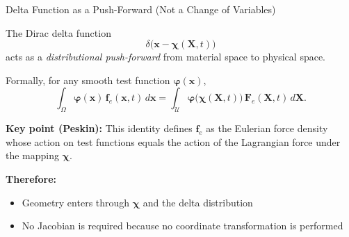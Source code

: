 \documentclass{beamer}
\begin{document}
\begin{frame}{Delta Function as a Push-Forward (Not a Change of Variables)}
\small

The Dirac delta function
\[
\delta\!\big(\mathbf{x}-\boldsymbol{\chi}(\mathbf{X},t)\big)
\]
acts as a \emph{distributional push-forward} from material space to physical space.

\medskip

Formally, for any smooth test function $\boldsymbol{\varphi}(\mathbf{x})$,
\[
\int_{\Omega}\boldsymbol{\varphi}(\mathbf{x})\,\mathbf{f}_e(\mathbf{x},t)\,d\mathbf{x}
=
\int_{\mathcal{U}}
\boldsymbol{\varphi}\!\big(\boldsymbol{\chi}(\mathbf{X},t)\big)\,
\mathbf{F}_e(\mathbf{X},t)\,d\mathbf{X}.
\]

\medskip

\textbf{Key point (Peskin):}
This identity defines $\mathbf{f}_e$ as the Eulerian force density whose action on test
functions equals the action of the Lagrangian force under the mapping $\boldsymbol{\chi}$.

\medskip

\textbf{Therefore:}
\begin{itemize}
    \item Geometry enters through $\boldsymbol{\chi}$ and the delta distribution
    \item No Jacobian is required because no coordinate transformation is performed
\end{itemize}

\end{frame}

\end{document}
